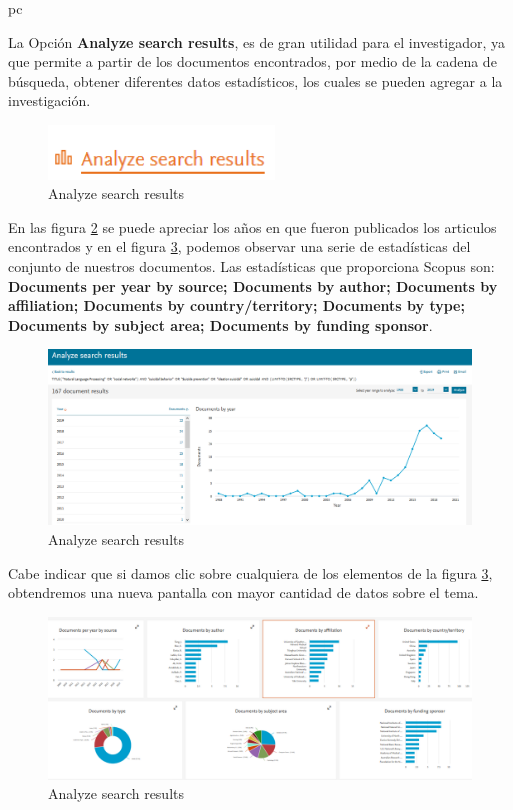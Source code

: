 pc\documentclass[a4paper,12pt,openany]{book}
\begin{document}
\begin{itemize}
La Opción \textbf{Analyze search results}, es de gran utilidad para el investigador, ya que permite a partir de los documentos encontrados, por medio de la cadena de búsqueda, obtener diferentes datos estadísticos, los cuales se pueden agregar a la investigación. 

        \begin{figure}[H]
        \centering
    	\includegraphics[width=6cm]{Scop22.png}
        \caption{Analyze search results}
        \label{fig:scop22}
        \end{figure}

En las figura \ref{fig:scop23} se puede apreciar los años en que fueron publicados los articulos encontrados y en el figura \ref{fig:scop24}, podemos observar una serie de estadísticas del conjunto de nuestros documentos. Las estadísticas que proporciona Scopus son: \textbf{Documents per year by source; Documents by author; Documents by affiliation; Documents by country/territory; Documents by type; Documents by subject area; Documents by funding sponsor}.

        \begin{figure}[H]
        \centering
    	\includegraphics[width=12cm]{Scop23.png}
        \caption{Analyze search results}
        \label{fig:scop23}
        \end{figure}

Cabe indicar que si damos clic sobre cualquiera de los elementos de la figura \ref{fig:scop24}, obtendremos una nueva pantalla con mayor cantidad de datos sobre el tema.

        \begin{figure}[H]
        \centering
    	\includegraphics[width=12cm]{Scop24.png}
        \caption{Analyze search results}
        \label{fig:scop24}
        \end{figure}





\end{itemize}
\end{document}

